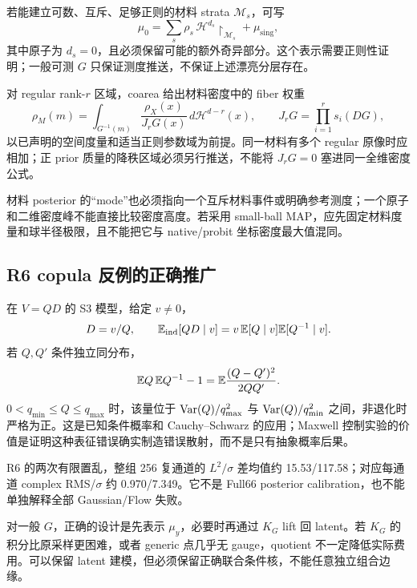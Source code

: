 若能建立可数、互斥、足够正则的材料 strata $\mathcal M_s$，可写
\[
\mu_0=\sum_s \rho_s\,\mathcal H^{d_s}\!\restriction_{\mathcal M_s}
+\mu_{\mathrm{sing}},
\]
其中原子为 $d_s=0$，且必须保留可能的额外奇异部分。这个表示需要正则性证明；一般可测 $G$ 只保证测度推送，不保证上述漂亮分层存在。

对 regular rank-$r$ 区域，coarea 给出材料密度中的 fiber 权重
\[
\rho_M(m)=
\int_{G^{-1}(m)}
\frac{\rho_X(x)}{J_rG(x)}\,d\mathcal H^{d-r}(x),
\qquad
J_rG=\prod_{i=1}^r s_i(DG),
\]
以已声明的空间度量和适当正则参数域为前提。同一材料有多个 regular 原像时应相加；正 prior 质量的降秩区域必须另行推送，不能将 $J_rG=0$ 塞进同一全维密度公式。

材料 posterior 的“mode”也必须指向一个互斥材料事件或明确参考测度；一个原子和二维密度峰不能直接比较密度高度。若采用 small-ball MAP，应先固定材料度量和球半径极限，且不能把它与 native/probit 坐标密度最大值混同。

\subsection{R6 copula 反例的正确推广}
在 $V=QD$ 的 S3 模型，给定 $v\ne0$，
\[
D=v/Q,\qquad
\mathbb E_{\mathrm{ind}}[QD\mid v]=v\,\mathbb E[Q\mid v]\mathbb E[Q^{-1}\mid v].
\]
若 $Q,Q'$ 条件独立同分布，
\[
\mathbb E Q\,\mathbb E Q^{-1}-1
=\mathbb E\frac{(Q-Q')^2}{2QQ'}.
\]
$0<q_{\min}\le Q\le q_{\max}$ 时，该量位于
$\operatorname{Var}(Q)/q_{\max}^2$ 与 $\operatorname{Var}(Q)/q_{\min}^2$ 之间，非退化时严格为正。这是已知条件概率和 Cauchy--Schwarz 的应用；Maxwell 控制实验的价值是证明这种表征错误确实制造错误散射，而不是只有抽象概率后果。

R6 的两次有限置乱，整组 256 复通道的 $L^2/\sigma$ 差均值约 15.53/117.58；对应每通道 complex RMS/$\sigma$ 约 0.970/7.349。它不是 Full66 posterior calibration，也不能单独解释全部 Gaussian/Flow 失败。

对一般 $G$，正确的设计是先表示 $\mu_y$，必要时再通过 $K_G$ lift 回 latent。若 $K_G$ 的积分比原采样更困难，或者 generic 点几乎无 gauge，quotient 不一定降低实际费用。可以保留 latent 建模，但必须保留正确联合条件核，不能任意独立组合边缘。

